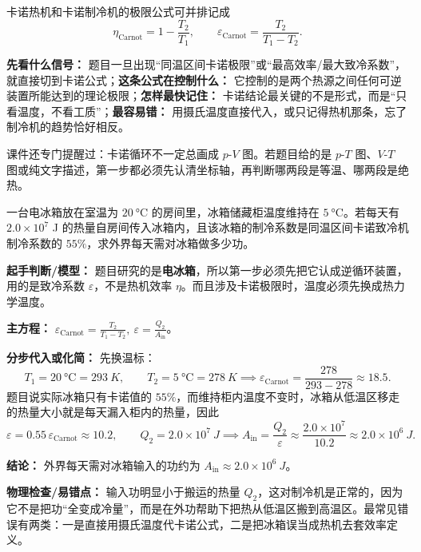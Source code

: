 \documentclass[lang=cn,11pt]{elegantbook}
\begin{document}
卡诺热机和卡诺制冷机的极限公式可并排记成
\[
\eta_{\text{Carnot}}=1-\frac{T_2}{T_1},\qquad
\varepsilon_{\text{Carnot}}=\frac{T_2}{T_1-T_2}.
\]

\begin{note}
\textbf{先看什么信号：} 题目一旦出现“同温区间卡诺极限”或“最高效率/最大致冷系数”，就直接切到卡诺公式；\textbf{这条公式在控制什么：} 它控制的是两个热源之间任何可逆装置所能达到的理论极限；\textbf{怎样最快记住：} 卡诺结论最关键的不是形式，而是“只看温度，不看工质”；\textbf{最容易错：} 用摄氏温度直接代入，或只记得热机那条，忘了制冷机的趋势恰好相反。
\end{note}

\begin{remark}
课件还专门提醒过：卡诺循环不一定总画成 \(p\)-\(V\) 图。若题目给的是 \(p\)-\(T\) 图、\(V\)-\(T\) 图或纯文字描述，第一步都必须先认清坐标轴，再判断哪两段是等温、哪两段是绝热。
\end{remark}

\begin{example}[电冰箱的输入功怎样由致冷系数反推]
一台电冰箱放在室温为 \(\SI{20}{\celsius}\) 的房间里，冰箱储藏柜温度维持在 \(\SI{5}{\celsius}\)。若每天有 \(2.0\times10^7\) J 的热量自房间传入冰箱内，且该冰箱的制冷系数是同温区间卡诺致冷机制冷系数的 \(55\%\)，求外界每天需对冰箱做多少功。
\end{example}

\begin{solution}
\textbf{起手判断/模型：} 题目研究的是\textbf{电冰箱}，所以第一步必须先把它认成逆循环装置，用的是致冷系数 \(\varepsilon\)，不是热机效率 \(\eta\)。而且涉及卡诺极限时，温度必须先换成热力学温度。

\textbf{主方程：} \(\varepsilon_{\text{Carnot}}=\frac{T_2}{T_1-T_2},\ \varepsilon=\frac{Q_2}{A_{\text{in}}}\)。

\textbf{分步代入或化简：} 先换温标：
\[
T_1=\SI{20}{\celsius}=293\ \si{K},\qquad
T_2=\SI{5}{\celsius}=278\ \si{K}
\implies \varepsilon_{\text{Carnot}}=\frac{278}{293-278}\approx 18.5.
\]
题目说实际冰箱只有卡诺值的 \(55\%\)，而维持柜内温度不变时，冰箱从低温区移走的热量大小就是每天漏入柜内的热量，因此
\[
\varepsilon=0.55\,\varepsilon_{\text{Carnot}}\approx 10.2,\qquad
Q_2=2.0\times10^7\ \si{J}
\implies
A_{\text{in}}=\frac{Q_2}{\varepsilon}
\approx \frac{2.0\times10^7}{10.2}
\approx 2.0\times10^6\ \si{J}.
\]

\textbf{结论：} 外界每天需对冰箱输入的功约为 \(A_{\text{in}}\approx 2.0\times10^6\ \si{J}\)。

\textbf{物理检查/易错点：} 输入功明显小于搬运的热量 \(Q_2\)，这对制冷机是正常的，因为它不是把功“全变成冷量”，而是在外功帮助下把热从低温区搬到高温区。最常见错误有两类：一是直接用摄氏温度代卡诺公式，二是把冰箱误当成热机去套效率定义。
\end{solution}
\end{document}
